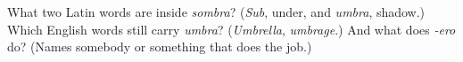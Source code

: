 \begin{tcolorbox}[breakable,colback=teal!4,colframe=teal!35!black,title={Before you move on}]
What two Latin words are inside \emph{sombra}? (\emph{Sub}, under, and \emph{umbra}, shadow.) Which English words still carry \emph{umbra}? (\emph{Umbrella}, \emph{umbrage}.) And what does \emph{-ero} do? (Names somebody or something that does the job.)
\end{tcolorbox}

